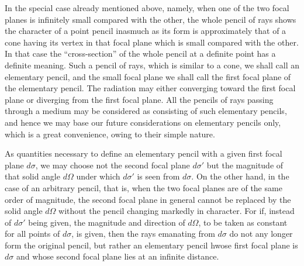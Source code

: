 \documentclass[12pt,oneside]{book}
\begin{document}
In the special case already mentioned above, namely, when one of the two focal planes is infinitely small compared with the other, the whole pencil of rays shows the character of a point pencil inasmuch as its form is approximately that of a cone having its vertex in that focal plane which is small compared with the other. In that case the ``cross-section'' of the whole pencil at a definite point has a definite meaning. Such a pencil of rays, which is similar to a cone, we shall call an elementary pencil, and the small focal plane we shall call the first focal plane of the elementary pencil. The radiation may either converging toward the first focal plane or diverging from the first focal plane. All the pencils of rays passing through a medium may be considered as consisting of such elementary pencils, and hence we may base our future considerations on elementary pencils only, which is a great convenience, owing to their simple nature. \par

As quantities necessary to define an elementary pencil with a given first focal plane $d\sigma$, we may choose not the second focal plane $d\sigma'$ but the magnitude of that solid angle $d\Omega$ under which $d\sigma'$ is seen from $d\sigma$. On the other hand, in the case of an arbitrary pencil, that is, when the two focal planes are of the same order of magnitude, the second focal plane in general cannot be replaced by the solid angle $d\Omega$ without the pencil changing markedly in character. For if, instead of $d\sigma'$ being given, the magnitude and direction of $d\Omega$, to be taken as constant for all points of $d\sigma$, is given, then the rays emanating from $d\sigma$ do not any longer form the original pencil, but rather an elementary pencil hwose first focal plane is $d\sigma$ and whose second focal plane lies at an infinite distance. \par
\end{document}

